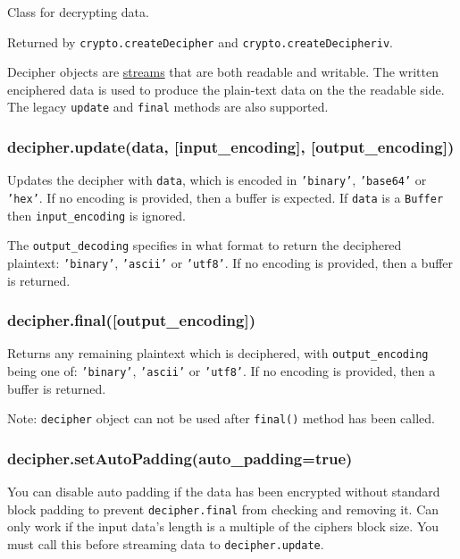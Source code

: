 Class for decrypting data.

Returned by \texttt{crypto.createDecipher} and
\texttt{crypto.createDecipheriv}.

Decipher objects are \href{stream.html}{streams} that are both readable
and writable. The written enciphered data is used to produce the
plain-text data on the the readable side. The legacy \texttt{update} and
\texttt{final} methods are also supported.

\subsubsection{decipher.update(data, {[}input\_encoding{]},
{[}output\_encoding{]})}\label{decipher.updatedata-inputux5fencoding-outputux5fencoding}

Updates the decipher with \texttt{data}, which is encoded in
\texttt{'binary'}, \texttt{'base64'} or \texttt{'hex'}. If no encoding
is provided, then a buffer is expected. If \texttt{data} is a
\texttt{Buffer} then \texttt{input\_encoding} is ignored.

The \texttt{output\_decoding} specifies in what format to return the
deciphered plaintext: \texttt{'binary'}, \texttt{'ascii'} or
\texttt{'utf8'}. If no encoding is provided, then a buffer is returned.

\subsubsection{decipher.final({[}output\_encoding{]})}\label{decipher.finaloutputux5fencoding}

Returns any remaining plaintext which is deciphered, with
\texttt{output\_encoding} being one of: \texttt{'binary'},
\texttt{'ascii'} or \texttt{'utf8'}. If no encoding is provided, then a
buffer is returned.

Note: \texttt{decipher} object can not be used after \texttt{final()}
method has been called.

\subsubsection{decipher.setAutoPadding(auto\_padding=true)}\label{decipher.setautopaddingautoux5fpaddingtrue}

You can disable auto padding if the data has been encrypted without
standard block padding to prevent \texttt{decipher.final} from checking
and removing it. Can only work if the input data's length is a multiple
of the ciphers block size. You must call this before streaming data to
\texttt{decipher.update}.

